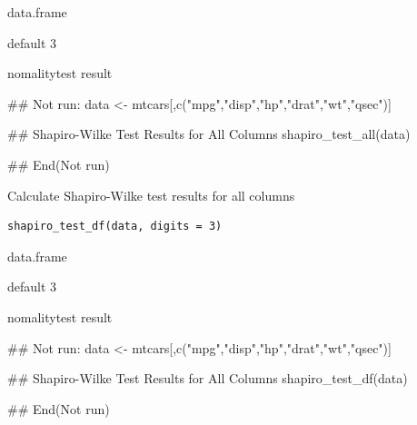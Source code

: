 \documentclass[a4paper]{book}
\begin{document}
%
\begin{Arguments}
\begin{ldescription}
\item[\code{data}] data.frame

\item[\code{digits}] default 3
\end{ldescription}
\end{Arguments}
%
\begin{Value}
nomalitytest result
\end{Value}
%
\begin{Examples}
\begin{ExampleCode}
\#\# Not run: 
data <- mtcars[,c("mpg","disp","hp","drat","wt","qsec")]

## Shapiro-Wilke Test Results for All Columns
shapiro_test_all(data)


## End(Not run)

\end{ExampleCode}
\end{Examples}
%
\begin{Description}
Calculate Shapiro-Wilke test results for all columns
\end{Description}
%
\begin{Usage}
\begin{verbatim}
shapiro_test_df(data, digits = 3)
\end{verbatim}
\end{Usage}
%
\begin{Arguments}
\begin{ldescription}
\item[\code{data}] data.frame

\item[\code{digits}] default 3
\end{ldescription}
\end{Arguments}
%
\begin{Value}
nomalitytest result
\end{Value}
%
\begin{Examples}
\begin{ExampleCode}
\#\# Not run: 
data <- mtcars[,c("mpg","disp","hp","drat","wt","qsec")]

## Shapiro-Wilke Test Results for All Columns
shapiro_test_df(data)


## End(Not run)
\end{ExampleCode}
\end{Examples}
\end{document}
